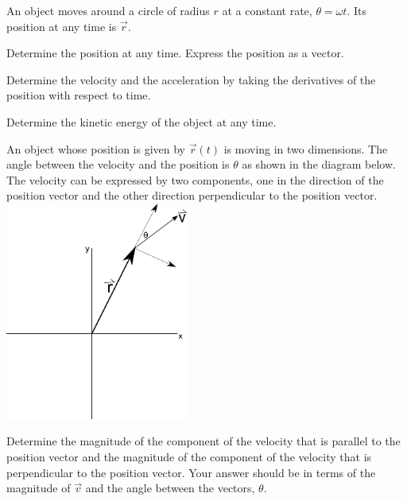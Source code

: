 \begin{problem}
\item An object moves around a circle of radius $r$  at a constant
  rate, $\theta=\omega t$. Its position at any time is $\vec{r}$.

  \begin{subproblem}
  \item Determine the position at any time. Express the position as
    a vector.
    \vfill
  \item Determine the velocity and the acceleration by taking the
    derivatives of the position with respect to time.
    \vfill
  \item Determine the kinetic energy of the object at any time.
    \vfill
  \end{subproblem}

  \clearpage

\item An object whose position is given by $\vec{r}(t)$ is moving in
  two dimensions. The angle between the velocity and the position is
  $\theta$ as shown in the diagram below. The velocity can be
  expressed by two components, one in the direction of the position
  vector and the other direction
  perpendicular to the position vector. \\
  \includegraphics[width=6cm]{ink/week12/angularComponents}

  \begin{subproblem}
  \item Determine the magnitude of the component of the velocity that
    is parallel to the position vector and the magnitude of the
    component of the velocity that is perpendicular to the position
    vector. Your answer should be in terms of the magnitude of
    $\vec{v}$ and the angle between the vectors, $\theta$.


\end{subproblem}
\end{problem}
